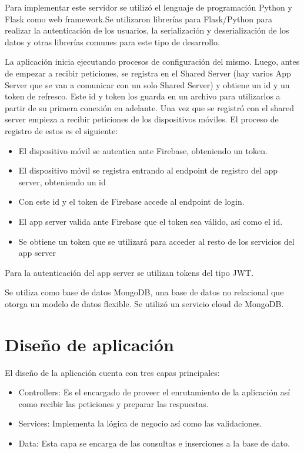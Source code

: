 \documentclass[a4paper, 12pt]{article}
\begin{document}
	Para implementar este servidor se utilizó el lenguaje de programación Python y Flask como web framework.Se utilizaron librerías para Flask/Python para realizar la autenticación de los usuarios,
	la serialización y deserialización de los datos y otras librerías comunes para este tipo de desarrollo.
	
	La aplicación inicia ejecutando procesos de configuración del mismo. Luego, antes de empezar a recibir peticiones, se registra en el Shared Server (hay varios App Server que se van a comunicar con un solo Shared Server) 
	y obtiene un id y un token de refresco. Este id y token los guarda en un archivo para utilizarlos a partir de su primera conexión en adelante.
	Una vez que se registró con el shared server empieza a recibir peticiones de los dispositivos móviles. El proceso de registro de estos es el siguiente:
	
	\begin{itemize}
	\item El dispositivo móvil se autentica ante Firebase, obteniendo un token.
	\item El dispositivo móvil se registra entrando al endpoint de registro del app server, obteniendo un id
	\item Con este id y el token de Firebase accede al endpoint de login.
	\item El app server valida ante Firebase que el token sea válido, así como el id.
	\item Se obtiene un token que se utilizará para acceder al resto de los servicios del app server
	\end{itemize}
	
	Para la autenticación del app server se utilizan tokens del tipo JWT.
	
	Se utiliza como base de datos MongoDB, una base de datos no relacional que otorga un modelo de datos flexible. Se utilizó un servicio cloud de MongoDB.
	

	\section{Diseño de aplicación}
	El diseño de la aplicación cuenta con tres capas principales:
	
	\begin{itemize}
	\item Controllers: Es el encargado de proveer el enrutamiento de la aplicación así como recibir las peticiones y preparar las respuestas.
	\item Services: Implementa la lógica de negocio así como las validaciones.
	\item Data: Esta capa se encarga de las consultas e inserciones a la base de dato.
	\end{itemize}
	
	
\end{document}
